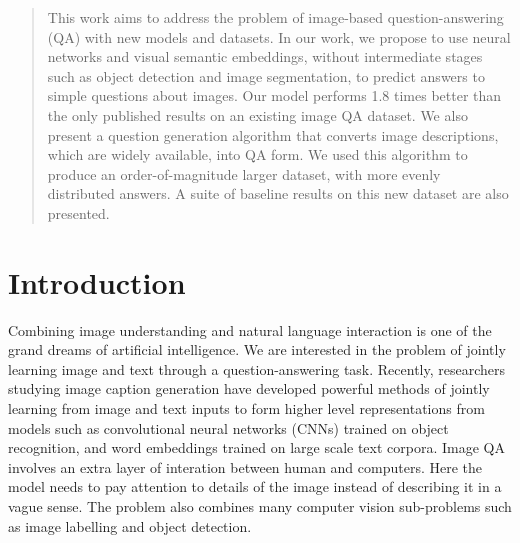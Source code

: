 \documentclass{article}
\renewcommand{\#}[1]{\textbf{#1}}
\begin{document}
 



\begin{abstract}
This work aims to address the problem of image-based question-answering (QA)
with new models and datasets. In our work, we propose to use neural networks
and visual semantic embeddings, without intermediate stages such as object
detection and image segmentation, to predict answers to simple questions about
images. Our model performs 1.8 times better than the only published results on
an existing image QA dataset. We also present a question
generation algorithm that converts image descriptions, which are widely
available, into QA form. We used this algorithm to produce an
order-of-magnitude larger dataset, with more evenly distributed
answers. A suite of baseline results on this new dataset are also presented.
\end{abstract}

\section{Introduction}
Combining image understanding and natural language interaction is one of the
grand dreams of artificial intelligence. We are interested in the problem of
jointly learning image and text through a question-answering task. Recently,
researchers studying image caption generation 
\cite{vinyals14,kiros14b,karpathy14,mao14,donahue14,chen14,fang14,xu15,lebret15,klein15} 
have developed powerful methods
of jointly learning from image and text inputs to form higher level representations
from models such as convolutional neural networks (CNNs) trained on object
recognition, and word embeddings trained on large scale text corpora. Image QA 
involves an extra layer of interation between human and computers. Here the model 
needs to pay attention to details 
of the image instead of describing it in a vague sense. The problem also 
combines many computer vision sub-problems such as image labelling and object 
detection. 
\end{document}
